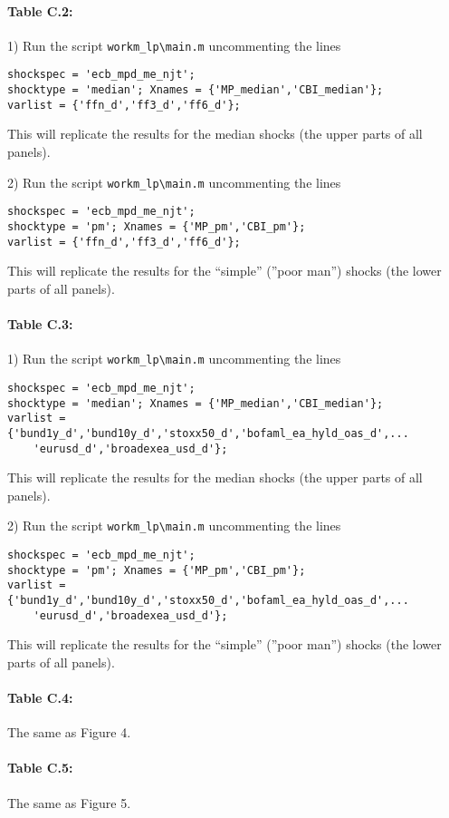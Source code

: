 \documentclass[12pt]{article}
\begin{document}
\paragraph{Table C.2:}
1) Run the script
\verb|workm_lp\main.m| uncommenting the lines
\begin{verbatim}
shockspec = 'ecb_mpd_me_njt';
shocktype = 'median'; Xnames = {'MP_median','CBI_median'};
varlist = {'ffn_d','ff3_d','ff6_d'};
\end{verbatim}
This will replicate the results for the median shocks (the upper parts of all panels).

2) Run the script
\verb|workm_lp\main.m| uncommenting the lines
\begin{verbatim}
shockspec = 'ecb_mpd_me_njt';
shocktype = 'pm'; Xnames = {'MP_pm','CBI_pm'};
varlist = {'ffn_d','ff3_d','ff6_d'};
\end{verbatim}
This will replicate the results for the ``simple'' (''poor man'') shocks (the lower parts of all panels).

\paragraph{Table C.3:}
1) Run the script
\verb|workm_lp\main.m| uncommenting the lines
\begin{verbatim}
shockspec = 'ecb_mpd_me_njt';
shocktype = 'median'; Xnames = {'MP_median','CBI_median'};
varlist = {'bund1y_d','bund10y_d','stoxx50_d','bofaml_ea_hyld_oas_d',...
    'eurusd_d','broadexea_usd_d'};
\end{verbatim}
This will replicate the results for the median shocks (the upper parts of all panels).

2) Run the script
\verb|workm_lp\main.m| uncommenting the lines
\begin{verbatim}
shockspec = 'ecb_mpd_me_njt';
shocktype = 'pm'; Xnames = {'MP_pm','CBI_pm'};
varlist = {'bund1y_d','bund10y_d','stoxx50_d','bofaml_ea_hyld_oas_d',...
    'eurusd_d','broadexea_usd_d'};
\end{verbatim}
This will replicate the results for the ``simple'' (''poor man'') shocks (the lower parts of all panels).

\paragraph{Table C.4:} The same as Figure 4.

\paragraph{Table C.5:} The same as Figure 5.
\end{document}

